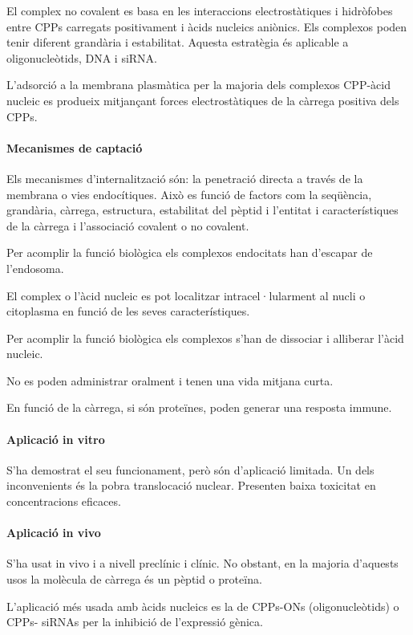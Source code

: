 El complex no covalent es basa en les interaccions electrostàtiques i hidròfobes entre CPPs carregats positivament i àcids nucleics aniònics. Els complexos poden tenir diferent grandària i estabilitat. Aquesta estratègia és aplicable a oligonucleòtids, DNA i siRNA.

L'adsorció a la membrana plasmàtica per la majoria dels complexos CPP-àcid nucleic es produeix mitjançant forces electrostàtiques de la càrrega positiva dels CPPs.

\paragraph{Mecanismes de captació}
Els mecanismes d'internalització són: la penetració directa a través de la membrana o vies endocítiques. Això es funció de factors com la seqüència, grandària, càrrega, estructura, estabilitat del pèptid i l'entitat i característiques de la càrrega i l'associació covalent o no covalent.

Per acomplir la funció biològica els complexos endocitats han d'escapar de l'endosoma.

El complex o l'àcid nucleic es pot localitzar intracel·lularment al nucli o citoplasma en funció de les seves característiques.

Per acomplir la funció biològica els complexos s'han de dissociar i alliberar l'àcid nucleic.

No es poden administrar oralment i tenen una vida mitjana curta.

En funció de la càrrega, si són proteïnes, poden generar una resposta immune.

\paragraph{Aplicació in vitro}
S'ha demostrat el seu funcionament, però són d'aplicació limitada. Un dels inconvenients és la pobra translocació nuclear. Presenten baixa toxicitat en concentracions eficaces.

\paragraph{Aplicació in vivo}
S'ha usat in vivo i a nivell preclínic i clínic. No obstant, en la majoria d'aquests usos la molècula de càrrega és un pèptid o proteïna.

L'aplicació més usada amb àcids nucleics es la de CPPs-ONs (oligonucleòtids) o CPPs- siRNAs per la inhibició de l'expressió gènica.

